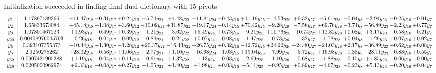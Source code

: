 \documentclass[9pt]{article}
\begin{document}
Initialization succeeded in finding final dual dictionary with 15 pivots
\[\begin{array}{c| c c@{\hskip 2pt} c@{\hskip 2pt} c@{\hskip 2pt} c@{\hskip 2pt} c@{\hskip 2pt} c@{\hskip 2pt} c@{\hskip 2pt} c@{\hskip 2pt} c@{\hskip 2pt} c@{\hskip 2pt} c@{\hskip 2pt} c@{\hskip 2pt} c@{\hskip 2pt} c@{\hskip 2pt} c@{\hskip 2pt} }
 y_{1}   &  1.17897189366 & + 11.47 y_{18} & +  0.31 y_{17} & +  0.24 y_{12} & +  5.74 y_{21} & +  4.48 y_{22} & -11.84 y_{24} & -0.43 y_{15} & + 11.19 y_{25} & -14.53 y_{26} & +  6.32 y_{27} & +  5.61 y_{28} & -0.04 y_{8} & -3.94 y_{23} & -0.25 y_{16} & -0.01 y_{7}\\
 y_{2}   &  1.65833673084 & + 45.18 y_{18} & +  1.08 y_{17} & +  3.60 y_{12} & -10.09 y_{21} & + 31.87 y_{22} & -19.17 y_{24} & -0.14 y_{15} & + 70.42 y_{25} & -9.28 y_{26} & -7.58 y_{27} & + 69.78 y_{28} & -3.74 y_{8} & + 56.89 y_{23} & -2.23 y_{16} & +  0.77 y_{7}\\
 y_{3}   &  1.07801467223 & +  1.93 y_{18} & -0.49 y_{17} & +  0.39 y_{12} & +  1.21 y_{21} & -3.62 y_{22} & +  5.49 y_{24} & +  0.73 y_{15} & +  9.21 y_{25} & + 11.76 y_{26} & + 10.74 y_{27} & + 12.82 y_{28} & +  0.08 y_{8} & +  3.17 y_{23} & -0.58 y_{16} & -0.21 y_{7}\\
 y_{20}   &  0.00458976045703 & -0.26 y_{18} & +  0.04 y_{17} & -0.09 y_{12} & +  0.84 y_{21} & -0.24 y_{22} & +  0.07 y_{24} & -0.08 y_{15} & -1.47 y_{25} & -0.73 y_{26} & -1.32 y_{27} & -1.78 y_{28} & +  0.04 y_{8} & -1.29 y_{23} & +  0.07 y_{16} & +  0.02 y_{7}\\
 y_{5}   &  0.393107355373 & -10.44 y_{18} & -1.30 y_{17} & -1.28 y_{12} & + 20.37 y_{21} & -16.43 y_{22} & + 26.75 y_{24} & +  0.32 y_{15} & -42.72 y_{25} & + 24.22 y_{26} & + 24.40 y_{27} & -24.03 y_{28} & +  2.17 y_{8} & -36.89 y_{23} & +  0.62 y_{16} & +  0.08 y_{7}\\
 y_{6}   &  2.1250278262 & + 28.02 y_{18} & +  0.56 y_{17} & +  1.06 y_{12} & -2.77 y_{21} & +  1.10 y_{22} & -16.68 y_{24} & -1.03 y_{15} & + 19.04 y_{25} & -7.99 y_{26} & -5.72 y_{27} & + 16.98 y_{28} & -1.38 y_{8} & + 28.11 y_{23} & -0.88 y_{16} & +  0.55 y_{7}\\
 y_{32}   &  0.0907421905288 & +  1.19 y_{18} & +  0.04 y_{17} & +  0.11 y_{12} & -0.61 y_{21} & +  1.32 y_{22} & -1.13 y_{24} & -0.03 y_{15} & +  2.69 y_{25} & -1.10 y_{26} & -0.68 y_{27} & +  1.88 y_{28} & -0.15 y_{8} & +  1.85 y_{23} & -0.06 y_{16} & -0.00 y_{7}\\
 y_{29}   &  0.0205000962974 & +  2.33 y_{18} & +  0.08 y_{17} & +  0.27 y_{12} & -1.05 y_{21} & +  1.40 y_{22} & -1.98 y_{24} & +  0.03 y_{15} & +  5.11 y_{25} & -0.95 y_{26} & +  0.89 y_{27} & +  4.67 y_{28} & -0.23 y_{8} & +  5.13 y_{23} & -0.20 y_{16} & +  0.04 y_{7}\\

\end{array}\]
\end{document}
